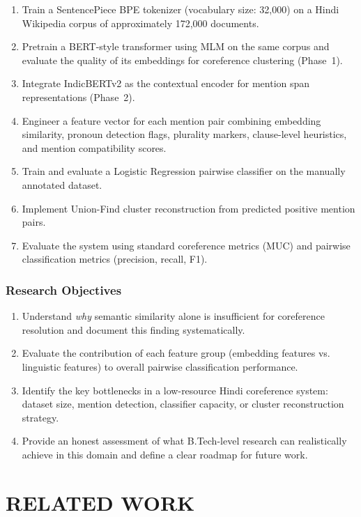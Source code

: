 \documentclass[12pt,a4paper]{report}
\begin{document}
\begin{enumerate}
    \item Train a SentencePiece BPE tokenizer (vocabulary size: 32,000) on a Hindi Wikipedia corpus of approximately 172,000 documents.
    \item Pretrain a BERT-style transformer using MLM on the same corpus and evaluate the quality of its embeddings for coreference clustering (Phase~1).
    \item Integrate IndicBERTv2 as the contextual encoder for mention span representations (Phase~2).
    \item Engineer a feature vector for each mention pair combining embedding similarity, pronoun detection flags, plurality markers, clause-level heuristics, and mention compatibility scores.
    \item Train and evaluate a Logistic Regression pairwise classifier on the manually annotated dataset.
    \item Implement Union-Find cluster reconstruction from predicted positive mention pairs.
    \item Evaluate the system using standard coreference metrics (MUC) and pairwise classification metrics (precision, recall, F1).
\end{enumerate}

\subsection{Research Objectives}

\begin{enumerate}
    \item Understand \textit{why} semantic similarity alone is insufficient for coreference resolution and document this finding systematically.
    \item Evaluate the contribution of each feature group (embedding features vs. linguistic features) to overall pairwise classification performance.
    \item Identify the key bottlenecks in a low-resource Hindi coreference system: dataset size, mention detection, classifier capacity, or cluster reconstruction strategy.
    \item Provide an honest assessment of what B.Tech-level research can realistically achieve in this domain and define a clear roadmap for future work.
\end{enumerate}


\chapter{RELATED WORK}
\end{document}
